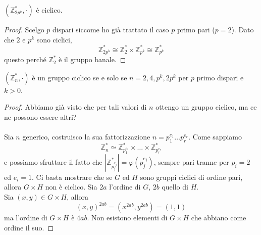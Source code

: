 \begin{corollario}
	$\left(\mathbb{Z}_{2p^k}^*,\cdot\right)$ è ciclico.
\end{corollario}
\begin{proof}
	Scelgo $p$ dispari siccome ho già trattato il caso $p$ primo pari ($p=2$). Dato che $2$ e $p^k$ sono ciclici, 
	\begin{equation*}
	\mathbb{Z}_{2p^k}^*\cong \mathbb{Z}_{2}^*\times\mathbb{Z}_{p^k}^*\cong \mathbb{Z}_{p^k}^*
	\end{equation*}
	questo perché $\mathbb{Z}_{2}^*$ è il gruppo banale.
\end{proof}
\begin{teorema}
	$\left(\mathbb{Z}_{n}^*,\cdot\right)$ è un gruppo ciclico se e solo se $n=2,4,p^k,2p^k$ per $p$ primo dispari e $k>0$.
\end{teorema}
\begin{proof}
	Abbiamo già visto che per tali valori di $n$ ottengo un gruppo ciclico, ma ce ne possono essere altri?\\ \\
	Sia $n$ generico, costruisco la sua fattorizzazione $n=p_1^{e_1}\dots p_r^{e_r}$. Come sappiamo
	\begin{equation*}
	\mathbb{Z}_n^*\simeq\mathbb{Z}_{p_1^{e_1}}^*\times\dots\times\mathbb{Z}_{p_r^{e_r}}^*
	\end{equation*}
	e possiamo sfruttare il fatto che $\left|\mathbb{Z}_{p_j^{e_j}}^*\right|=\varphi\left(p_j^{e_j}\right)$, sempre pari tranne per $p_i=2$ ed $e_i=1$. Ci basta mostrare che se $G$ ed $H$ sono gruppi ciclici di ordine pari, allora $G\times H$ non è ciclico. Sia $2a$ l'ordine di $G$, $2b$ quello di $H$. \\ Sia $(x,y)\in G\times H$, allora
	\begin{equation*}
	(x,y)^{2ab}=(x^{2ab},y^{2ab})=(1,1)
	\end{equation*}
	ma l'ordine di $G\times H$ è $4ab$. Non esistono elementi di $G\times H$ che abbiano come ordine il suo.
\end{proof}




\label{lezione8}
